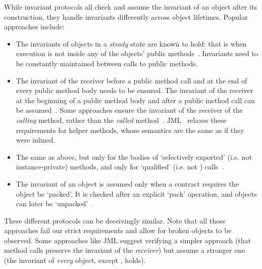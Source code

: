 While invariant protocols all check and assume the invariant of an object after its construction, they handle invariants differently across object lifetimes. Popular approaches include:%
\begin{itemize}
\item The invariants of objects in a \textit{steady} state are known to hold: that is when execution is not inside any of the objects' public methods~\cite{Gopinathan:2008:RMO:1483018.1483028}. Invariants need to be constantly maintained between calls to public methods.%
\item 
The invariant of the receiver before a public method call and at the end of every public method body needs to be ensured. The invariant of the receiver at the beginning of a public method body and after a public method call can be assumed~\cite{Burdy2005,drossopoulou2008unified}.  
Some approaches ensure the invariant of the receiver of the \emph{calling} method, rather than the \emph{called} method~\cite{DBLP:journals/scp/MullerPL06}.
JML~\cite{JML} relaxes these requirements for helper methods, whose semantics are the same as if they were inlined.


\item The same as above, but only for the bodies of `selectively exported' (i.e. not instance-private) methods, and only for `qualified' (i.e. not \Q@this@) calls~\cite{meyer2016class}.
\item The invariant of an object is assumed only when a contract requires the object be `packed'. It is checked after an explicit `pack' operation, and objects can later be `unpacked'~\cite{DBLP:journals/jot/BarnettDFLS04}.
\end{itemize}\SS\LS[0.5]
\noindent These different protocols can be deceivingly similar.
Note that all those approaches fail our strict requirements and allow for broken objects to be observed.
Some approaches like JML suggest verifying a simpler approach (that method calls preserve the invariant of the \emph{receiver}) but assume a stronger one (the invariant of \emph{every} object, except \Q@this@, holds).


